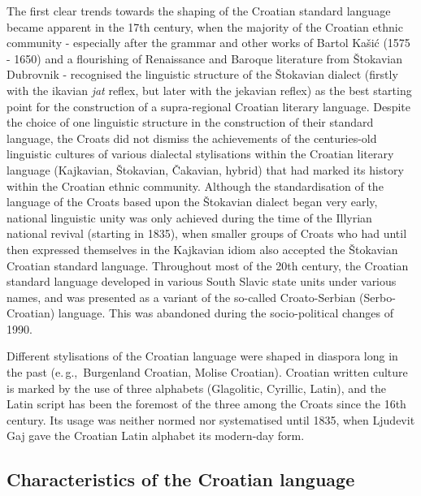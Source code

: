 \begin{multicols}{2}

The first clear trends towards the shaping of the Croatian standard language became apparent in the 17th century, when the majority of the Croatian ethnic community - especially after the grammar and other works of Bartol Kašić (1575 - 1650) and a flourishing of Renaissance and Baroque literature from Štokavian Dubrovnik - recognised the linguistic structure of the Štokavian dialect (firstly with the ikavian \emph{jat} reflex, but later with the jekavian reflex) as the best starting point for the construction of a supra-regional Croatian literary language. Despite the choice of one linguistic structure in the construction of their standard language, the Croats did not dismiss the achievements of the centuries-old linguistic cultures of various dialectal stylisations within the Croatian literary language (Kajkavian, Štokavian, Čakavian, hybrid) that had marked its history within the Croatian ethnic community. Although the standardisation of the language of the Croats based upon the Štokavian dialect began very early, national linguistic unity was only achieved during the time of the Illyrian national revival (starting in 1835), when smaller groups of Croats who had until then expressed themselves in the Kajkavian idiom also accepted the Štokavian Croatian standard language. Throughout most of the 20th century, the Croatian standard language developed in various South Slavic state units under various names, and was presented as a variant of the so-called Croato-Serbian (Serbo-Croatian) language. This was abandoned during the socio-political changes of 1990.

Different stylisations of the Croatian language were shaped in diaspora long in the past (e.\,g.,~Burgenland Croatian, Molise Croatian). Croatian written culture is marked by the use of three alphabets (Glagolitic, Cyrillic, Latin), and the Latin script has been the foremost of the three among the Croats since the 16th century. Its usage was neither normed nor systematised until 1835, when Ljudevit Gaj gave the Croatian Latin alphabet its modern-day form.

\subsection{Characteristics of the Croatian language}


\end{multicols}
